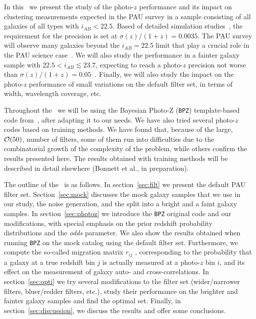 In this \doctype \ we present the study of the photo-$z$ performance and its impact on clustering measurements expected in the PAU survey in a sample consisting of all galaxies of all types with $i_{AB} < 22.5$. Based of detailed simulation studies~\citep{Gaztanaga2012}, the requirement for the precision is set at $\sigma(z)/(1+z) = 0.0035$. The PAU survey will observe many galaxies beyond the $i_{AB}=22.5$ limit that play a crucial role in the PAU science case~\citep{Gaztanaga2012}. We will also study the performance in a fainter galaxy sample with $22.5 < i_{AB} \lesssim 23.7$, expecting to reach a photo-$z$ precision not worse than $\sigma(z)/(1+z) = 0.05$~\citep{Gaztanaga2012}. Finally, we will also study the impact on the photo-$z$ performance of small variations on the default filter set, in terms of width, wavelength coverage, etc.

Throughout the \doctype\ we will be using the Bayesian Photo-Z ({\tt BPZ}) template-based code from~\citet{Benitez2000}, after adapting it to our needs. We have also tried several photo-$z$ codes based on training methods. We have found that, because of the large, ${\cal O}(50)$, number of filters, some of them run into difficulties due to the combinatorial growth of the complexity of the problem, while others confirm the results presented here. The results obtained with training methods will be described in detail elsewhere (Bonnett et al., in preparation).

The outline of the \doctype\ is as follows. In section~\ref{sec:filt} we present the default PAU filter set. Section~\ref{sec:mock} discusses the mock galaxy samples that we use in our study, the noise generation, and the split into a bright and a faint galaxy samples. In section~\ref{sec:photoz} we introduce the {\tt BPZ} original code and our modifications, with special emphasis on the prior redshift probability distributions and the {\em odds} parameter. We also show the results obtained when running {\tt BPZ} on the mock catalog using the default filter set. Furthermore, we compute the so-called migration matrix $r_{ij}$ \citep{Gaztanaga2012}, corresponding to the probability that a galaxy at a true redshift bin $j$ is actually measured at a photo-$z$ bin $i$, and its effect on the measurement of galaxy auto- and cross-correlations. In section~\ref{sec:opti} we try several modifications to the filter set (wider/narrower filters, bluer/redder filters, etc.), study their performance on the brighter and fainter galaxy samples and find the optimal set. Finally, in section~\ref{sec:discussion}, we discuss the results and offer some conclusions.
